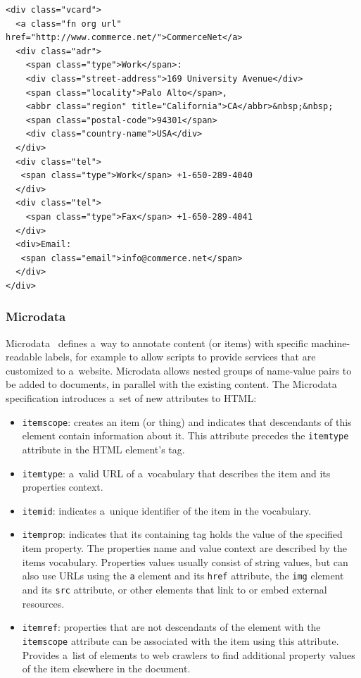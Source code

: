 \begin{lstlisting}[caption={[Sample code snippet with embedded hCard Microformat mark-up.]{Sample code snippet with embedded \texttt{hCard} Microformat mark-up. Source: \url{http://microformats.org/wiki/hcard}}},label={code:microformats}]
<div class="vcard">
  <a class="fn org url" href="http://www.commerce.net/">CommerceNet</a>
  <div class="adr">
    <span class="type">Work</span>:
    <div class="street-address">169 University Avenue</div>
    <span class="locality">Palo Alto</span>,  
    <abbr class="region" title="California">CA</abbr>&nbsp;&nbsp;
    <span class="postal-code">94301</span>
    <div class="country-name">USA</div>
  </div>
  <div class="tel">
   <span class="type">Work</span> +1-650-289-4040
  </div>
  <div class="tel">
    <span class="type">Fax</span> +1-650-289-4041
  </div>
  <div>Email: 
   <span class="email">info@commerce.net</span>
  </div>
</div>
\end{lstlisting}

\subsubsection{Microdata}
Microdata~\cite{Hickson2010} defines a~way to annotate content (or items) with specific machine-readable labels,
for example to allow scripts to provide services that are customized to a~website.
Microdata allows nested groups of name-value pairs to be added to documents,
in parallel with the existing content.
The Microdata specification introduces a~set of new attributes to HTML:

\begin{itemize}
\item \texttt{itemscope}: creates an item (or thing) and indicates that descendants of this element contain information about it. This attribute precedes the \texttt{itemtype} attribute in the HTML element's tag.
\item \texttt{itemtype}: a~valid URL of a~vocabulary that describes the item and its properties context.
\item \texttt{itemid}: indicates a~unique identifier of the item in the vocabulary.
\item \texttt{itemprop}: indicates that its containing tag holds the value of the specified item property. The properties name and value context are described by the items vocabulary. Properties values usually consist of string values, but can also use URLs using the \texttt{a} element and its \texttt{href} attribute, the \texttt{img} element and its \texttt{src} attribute, or other elements that link to or embed external resources.
\item \texttt{itemref}: properties that are not descendants of the element with the \texttt{itemscope} attribute can be associated with the item using this attribute. Provides a~list of elements to web crawlers to find additional property values of the item elsewhere in the document.
\end{itemize}

